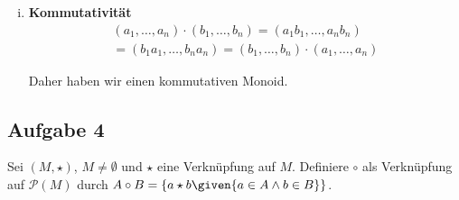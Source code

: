 \begin{enumerate}[a)]
\begin{enumerate}[i)]
      \item \textbf{Kommutativität}
        \begin{align*}
          (a_1, \ldots, a_n) \cdot (b_1, \ldots, b_n) = (a_1 b_1, \ldots, a_n b_n) \\
          = (b_1 a_1 , \ldots, b_n a_n) = (b_1, \ldots, b_n) \cdot (a_1, \ldots, a_n)
        \end{align*}

      Daher haben wir einen kommutativen Monoid.

    \end{enumerate}
\end{enumerate}
%
%
%

\newpage
\subsection*{Aufgabe 4} %
\label{sub:aufgabe_4}

Sei $(M, \star)$, $M \neq \emptyset$ und $\star$ eine Verknüpfung auf $M$. Definiere $\circ$ als Verknüpfung auf $\mathcal{P}(M)$ durch $  A \circ B = \{  a \star b \given{a \in A \land b \in B} \} $.

